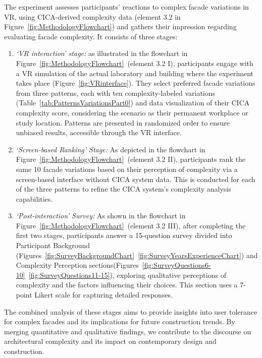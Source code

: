 %    


The experiment assesses participants' reactions to complex facade variations in VR, using CICA-derived complexity data (element 3.2 in Figure~\ref{fig:MethodologyFlowchart}) and gathers their impression regarding evaluating facade complexity.
It consists of three stages:

\begin{enumerate}
    \item \textit{`VR interaction' stage:}  as illustrated in the flowchart in Figure~\ref{fig:MethodologyFlowchart}~(element 3.2 I), participants engage with a VR simulation of the actual laboratory and building where the experiment takes place (Figure~\ref{fig:VRinterface}). They select preferred facade variations from three patterns, each with ten complexity-labeled variations (Table~\ref{tab:PatternsVariationsPart0}) and data visualization of their CICA complexity score, considering the scenario as their permanent workplace or study location.
    Patterns are presented in randomized order to ensure unbiased results, accessible through the VR interface.

    \item \textit{`Screen-based Ranking' Stage:} As depicted in the flowchart in Figure~\ref{fig:MethodologyFlowchart}~(element 3.2 II), participants rank the same 10 facade variations based on their perception of complexity via a screen-based interface without CICA system data.
    This is conducted for each of the three patterns to refine the CICA system's complexity analysis capabilities.

    \item \textit{`Post-interaction' Survey:} As shown in the flowchart in Figure~\ref{fig:MethodologyFlowchart}~(element 3.2 III), after completing the first two stages, participants answer a 15-question survey divided into Participant Background (Figures~\ref{fig:SurveyBackgroundChart}~\ref{fig:SurveyYearsExperienceChart}) and Complexity Perception sections(Figures~\ref{fig:SurveyQuestions6-10}~\ref{fig:SurveyQuestions11-15}), exploring qualitative perceptions of complexity and the factors influencing their choices.
    This section uses a 7-point Likert scale for capturing detailed responses.
\end{enumerate}


The combined analysis of these stages aims to provide insights into user tolerance for complex facades and its implications for future construction trends.
By merging quantitative and qualitative findings, we contribute to the discourse on architectural complexity and its impact on contemporary design and construction.